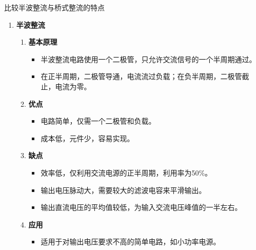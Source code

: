 \documentclass[dvipsnames, svgnames,a4paper,11pt]{article}
\begin{document}
\clearpage


	\begin{question}
		比较半波整流与桥式整流的特点
	\end{question}


		\begin{enumerate}
			\item \textbf{半波整流}
				\begin{enumerate}
					\item \textbf{基本原理}
						\begin{itemize}
							\item 半波整流电路使用一个二极管，只允许交流信号的一个半周期通过。
							\item 在正半周期，二极管导通，电流流过负载；在负半周期，二极管截止，电流为零。
						\end{itemize}
					\item \textbf{优点}
						\begin{itemize}
							\item 电路简单，仅需一个二极管和负载。
							\item 成本低，元件少，容易实现。
						\end{itemize}
					\item \textbf{缺点}
						\begin{itemize}
							\item 效率低，仅利用交流电源的正半周期，利用率为50\%。
							\item 输出电压脉动大，需要较大的滤波电容来平滑输出。
							\item 输出直流电压的平均值较低，为输入交流电压峰值的一半左右。
						\end{itemize}
					\item \textbf{应用}
						\begin{itemize}
							\item 适用于对输出电压要求不高的简单电路，如小功率电源。
						\end{itemize}
				\end{enumerate}
		

\end{enumerate}
\end{document}
